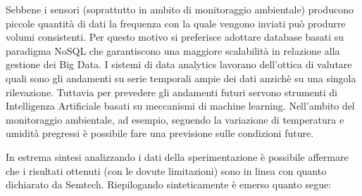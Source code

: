 \documentclass[12pt,a4paper,openright,twoside]{report}
\begin{document}
Sebbene i sensori (soprattutto in ambito di monitoraggio ambientale) producono piccole quantit\`a di dati la frequenza con la quale vengono inviati pu\`o produrre volumi consistenti.  
Per questo motivo si preferisce adottare database basati su paradigma NoSQL che garantiscono una maggiore scalabilit\`a in relazione alla gestione dei Big Data. I sistemi di data analytics lavorano dell'ottica di valutare quali sono gli andamenti su serie temporali ampie dei dati anzich\`e su una singola rilevazione. Tuttavia per prevedere gli andamenti futuri servono strumenti di Intelligenza Artificiale basati su meccanismi di machine learning. Nell'ambito del monitoraggio ambientale, ad esempio, seguendo la variazione di temperatura e umidit\`a pregressi \`e possibile fare una previsione sulle condizioni future. 

In estrema sintesi analizzando i dati della sperimentazione \`e possibile affermare che i risultati  ottenuti (con le dovute limitazioni) sono in linea con quanto dichiarato da Semtech. 
Riepilogando sinteticamente \`e emerso quanto segue:
\end{document}
